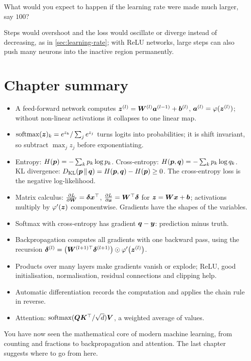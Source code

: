 \begin{exercise}
What would you expect to happen if the learning rate were made much larger, say
$100$?
\end{exercise}
\begin{solution}
Steps would overshoot and the loss would oscillate or diverge instead of
decreasing, as in \cref{sec:learning-rate}; with ReLU networks, large steps can
also push many neurons into the inactive region permanently.
\end{solution}

\section{Chapter summary}\label{sec:ch11-summary}

\begin{keytakeaways}
\begin{itemize}
  \item A feed-forward network computes $\bm{z}^{(l)} = \bm{W}^{(l)}\bm{a}^{(l-1)} + \bm{b}^{(l)}$,
    $\bm{a}^{(l)} = \varphi(\bm{z}^{(l)})$; without non-linear activations it collapses to
    one linear map.
  \item $\operatorname{softmax}(\bm{z})_k = e^{z_k}/\sum_je^{z_j}$ turns logits into probabilities; it is
    shift invariant, so subtract $\max_jz_j$ before exponentiating.
  \item Entropy: $H(\bm{p}) = -\sum_kp_k\log p_k$. Cross-entropy: $H(\bm{p}, \bm{q}) =
    -\sum_kp_k\log q_k$. KL divergence: $D_{\operatorname{KL}}(\bm{p}\,\Vert\,\bm{q}) = H(\bm{p}, \bm{q}) -
    H(\bm{p}) \ge 0$. The cross-entropy loss is the negative log-likelihood.
  \item Matrix calculus: $\frac{\partial L}{\partial \bm{W}} = \bm{\delta}\bm{x}^\top$, $\frac{\partial L}{\partial \bm{x}} = \bm{W}^\top\bm{\delta}$
    for $\bm{z} = \bm{W}\bm{x} + \bm{b}$; activations multiply by $\varphi'(\bm{z})$ componentwise.
    Gradients have the shapes of the variables.
  \item Softmax with cross-entropy has gradient $\bm{q} - \bm{y}$: prediction minus truth.
  \item Backpropagation computes all gradients with one backward pass, using
    the recursion
    $\bm{\delta}^{(l)} = \bigl(\bm{W}^{(l+1)\top}\bm{\delta}^{(l+1)}\bigr) \odot
    \varphi'\bigl(\bm{z}^{(l)}\bigr)$.
  \item Products over many layers make gradients vanish or explode; ReLU, good
    initialisation, normalisation, residual connections and clipping help.
  \item Automatic differentiation records the computation and applies the chain
    rule in reverse.
  \item Attention: $\operatorname{softmax}(\bm{Q}\bm{K}^\top/\sqrt d)\bm{V}$, a weighted average of values.
\end{itemize}
\end{keytakeaways}

You have now seen the mathematical core of modern machine learning, from counting
and fractions to backpropagation and attention. The last chapter suggests where
to go from here.
